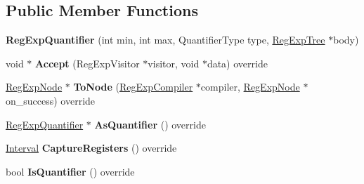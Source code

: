 \subsection*{Public Member Functions}
\begin{DoxyCompactItemize}
\item 
{\bfseries Reg\+Exp\+Quantifier} (int min, int max, Quantifier\+Type type, \hyperlink{classv8_1_1internal_1_1_reg_exp_tree}{Reg\+Exp\+Tree} $\ast$body)\hypertarget{classv8_1_1internal_1_1_reg_exp_quantifier_affd7c7fc8db27132916ef632a5434edb}{}\label{classv8_1_1internal_1_1_reg_exp_quantifier_affd7c7fc8db27132916ef632a5434edb}

\item 
void $\ast$ {\bfseries Accept} (Reg\+Exp\+Visitor $\ast$visitor, void $\ast$data) override\hypertarget{classv8_1_1internal_1_1_reg_exp_quantifier_adcadbe6e79cf873328c8af711790dcdb}{}\label{classv8_1_1internal_1_1_reg_exp_quantifier_adcadbe6e79cf873328c8af711790dcdb}

\item 
\hyperlink{classv8_1_1internal_1_1_reg_exp_node}{Reg\+Exp\+Node} $\ast$ {\bfseries To\+Node} (\hyperlink{classv8_1_1internal_1_1_reg_exp_compiler}{Reg\+Exp\+Compiler} $\ast$compiler, \hyperlink{classv8_1_1internal_1_1_reg_exp_node}{Reg\+Exp\+Node} $\ast$on\+\_\+success) override\hypertarget{classv8_1_1internal_1_1_reg_exp_quantifier_ae479289e3ca0572b349524c8d46737c7}{}\label{classv8_1_1internal_1_1_reg_exp_quantifier_ae479289e3ca0572b349524c8d46737c7}

\item 
\hyperlink{classv8_1_1internal_1_1_reg_exp_quantifier}{Reg\+Exp\+Quantifier} $\ast$ {\bfseries As\+Quantifier} () override\hypertarget{classv8_1_1internal_1_1_reg_exp_quantifier_a336b7463706ccaecfbe04a7e35d232c0}{}\label{classv8_1_1internal_1_1_reg_exp_quantifier_a336b7463706ccaecfbe04a7e35d232c0}

\item 
\hyperlink{classv8_1_1internal_1_1_interval}{Interval} {\bfseries Capture\+Registers} () override\hypertarget{classv8_1_1internal_1_1_reg_exp_quantifier_a8574412e3ee34483fba8bdb5d5bd9a82}{}\label{classv8_1_1internal_1_1_reg_exp_quantifier_a8574412e3ee34483fba8bdb5d5bd9a82}

\item 
bool {\bfseries Is\+Quantifier} () override\hypertarget{classv8_1_1internal_1_1_reg_exp_quantifier_aa146f28c345cf3b47ddc67bf5f6b86be}{}\label{classv8_1_1internal_1_1_reg_exp_quantifier_aa146f28c345cf3b47ddc67bf5f6b86be}


\end{DoxyCompactItemize}
